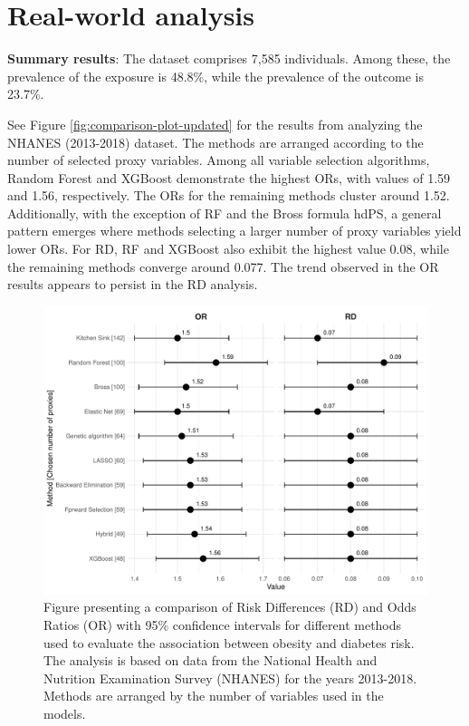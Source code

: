 \documentclass[sn-vancouver,Numbered,lineno,pdflatex]{sn-jnl}
\begin{document}
\section{Real-world analysis}\label{real-world-analysis}

\textbf{Summary results}: The dataset comprises 7,585 individuals. Among
these, the prevalence of the exposure is 48.8\%, while the prevalence of
the outcome is 23.7\%.

See Figure \ref{fig:comparison-plot-updated} for the results from
analyzing the NHANES (2013-2018) dataset. The methods are arranged
according to the number of selected proxy variables. Among all variable
selection algorithms, Random Forest and XGBoost demonstrate the highest
ORs, with values of 1.59 and 1.56, respectively. The ORs for the
remaining methods cluster around 1.52. Additionally, with the exception
of RF and the Bross formula hdPS, a general pattern emerges where
methods selecting a larger number of proxy variables yield lower ORs.
For RD, RF and XGBoost also exhibit the highest value 0.08, while the
remaining methods converge around 0.077. The trend observed in the OR
results appears to persist in the RD analysis.

\begin{figure}[th]

{\centering \includegraphics[width=1\linewidth,]{manuscript_files/figure-latex/unnamed-chunk-3-1} 

}

\caption{Figure presenting a comparison of Risk Differences (RD) and Odds Ratios (OR) with 95\% confidence intervals for different methods used to evaluate the association between obesity and diabetes risk. The analysis is based on data from the National Health and Nutrition Examination Survey (NHANES) for the years 2013-2018. Methods are arranged by the number of variables used in the models.\label{fig:comparison-plot-updated}}\label{fig:unnamed-chunk-3}
\end{figure}
\end{document}
